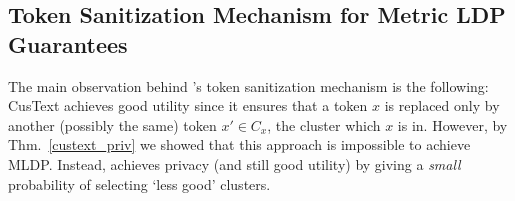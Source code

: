 

    





\subsection{Token Sanitization Mechanism for Metric LDP Guarantees}\label{sec:clusant_mldp_mech}


The main observation behind \clusant's token sanitization mechanism is the following: CusText achieves good utility since it ensures that a token $x$ is replaced only by another (possibly the same) token $x' \in C_x$, the cluster which $x$ is in. However, by Thm.~\ref{custext_priv} we showed that this approach is impossible to achieve MLDP. Instead, \clusant achieves privacy (and still good utility) by giving a {\em small} probability of selecting `less good' clusters. 

